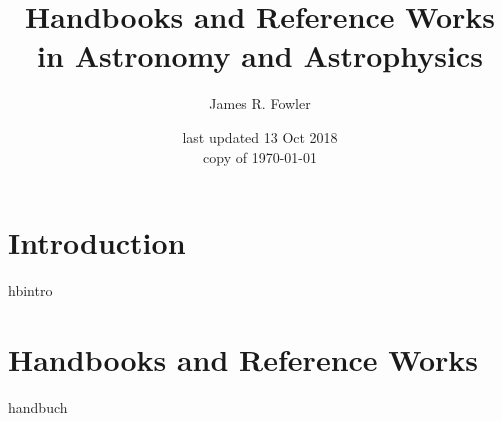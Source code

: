 \documentclass{article}
\begin{document}
\title{Handbooks and Reference Works in Astronomy and Astrophysics}
\author{James R. Fowler}
\date{last updated 13 Oct 2018\\ copy of \today}

\maketitle

\tableofcontents
\listoftables


\section{Introduction}
{hbintro}

\section{Handbooks and Reference Works}
{handbuch}
\end{document}
